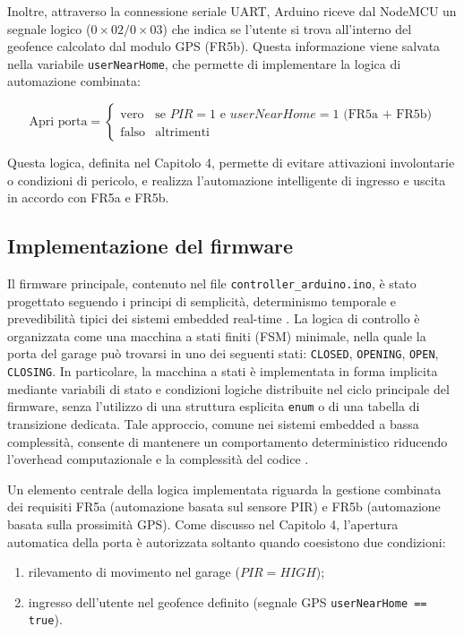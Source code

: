 Inoltre, attraverso la connessione seriale UART, Arduino riceve dal NodeMCU un segnale logico ($0\times02/0\times03$) che indica se l'utente si trova all'interno del geofence calcolato dal modulo GPS (FR5b). Questa informazione viene salvata nella variabile \texttt{userNearHome}, che permette di implementare la logica di automazione combinata:

\[
\text{Apri porta} = 
\begin{cases} 
\text{vero} & \text{se } PIR=1 \text{ e } userNearHome = 1 \text{ (FR5a + FR5b)} \\
\text{falso} & \text{altrimenti}
\end{cases}
\]

Questa logica, definita nel Capitolo 4, permette di evitare attivazioni involontarie o condizioni di pericolo, e realizza l'automazione intelligente di ingresso e uscita in accordo con FR5a e FR5b.

\subsection*{Implementazione del firmware}
Il firmware principale, contenuto nel file \texttt{controller\_arduino.ino}, è stato progettato seguendo i principi di semplicità, determinismo temporale e prevedibilità tipici dei sistemi embedded real-time \cite{Marwedel2021}. La logica di controllo è organizzata come una macchina a stati finiti (FSM) minimale, nella quale la porta del garage può trovarsi in uno dei seguenti stati: \texttt{CLOSED}, \texttt{OPENING}, \texttt{OPEN}, \texttt{CLOSING}.
In particolare, la macchina a stati è implementata in forma implicita
mediante variabili di stato e condizioni logiche distribuite nel ciclo
principale del firmware, senza l’utilizzo di una struttura esplicita
\texttt{enum} o di una tabella di transizione dedicata. Tale approccio,
comune nei sistemi embedded a bassa complessità, consente di mantenere
un comportamento deterministico riducendo l’overhead computazionale e
la complessità del codice \cite{Marwedel2021}.

Un elemento centrale della logica implementata riguarda la gestione combinata dei requisiti FR5a (automazione basata sul sensore PIR) e FR5b (automazione basata sulla prossimità GPS). Come discusso nel Capitolo 4, l'apertura automatica della porta è autorizzata soltanto quando coesistono due condizioni:
\begin{enumerate}
    \item rilevamento di movimento nel garage ($PIR=HIGH$);
    \item ingresso dell'utente nel geofence definito (segnale GPS \texttt{userNearHome == true}).
\end{enumerate}

